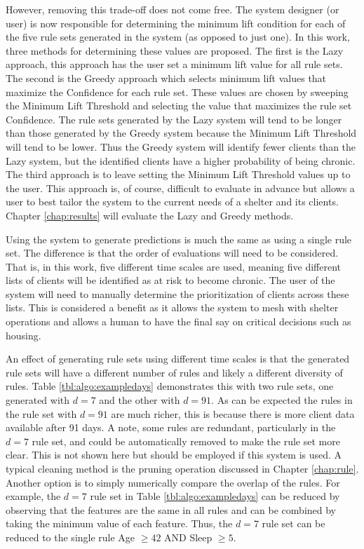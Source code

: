 However, removing this trade-off does not come free. The system designer (or user) is now responsible for determining the minimum lift condition for each of the five rule sets generated in the \Abb system (as opposed to just one). In this work, three methods for determining these values are proposed. The first is the Lazy approach, this approach has the user set a minimum lift value for all rule sets. The second is the Greedy approach which selects minimum lift values that maximize the Confidence for each rule set. These values are chosen by sweeping the Minimum Lift Threshold and selecting the value that maximizes the rule set Confidence.
The rule sets generated by the Lazy system will tend to be longer than those generated by the Greedy system because the Minimum Lift Threshold will tend to be lower.
Thus the Greedy system will identify fewer clients than the Lazy system, but the identified clients have a higher probability of being chronic. The third approach is to leave setting the Minimum Lift Threshold values up to the user. This approach is, of course, difficult to evaluate in advance but allows a user to best tailor the system to the current needs of a shelter and its clients. Chapter \ref{chap:results} will evaluate the Lazy and Greedy methods.


Using the \Abb system to generate predictions is much the same as using a single rule set. The difference is that the order of evaluations will need to be considered. That is, in this work, five different time scales are used, meaning five different lists of clients will be identified as at risk to become chronic. The user of the system will need to manually determine the prioritization of clients across these lists. This is considered a benefit as it allows the system to mesh with shelter operations and allows a human to have the final say on critical decisions such as housing. 

An effect of generating rule sets using different time scales is that the generated rule sets will have a different number of rules and likely a different diversity of rules. Table \ref{tbl:algo:exampledays} demonstrates this with two rule sets, one generated with $d=7$ and the other with $d=91$. As can be expected the rules in the rule set with $d=91$ are much richer, this is because there is more client data available after 91 days. A note, some rules are redundant, particularly in the $d=7$ rule set, and could be automatically removed to make the rule set more clear. This is not shown here but should be employed if this system is used. A typical cleaning method is the pruning operation discussed in Chapter \ref{chap:rule}. Another option is to simply numerically compare the overlap of the rules. For example, the $d=7$ rule set in Table \ref{tbl:algo:exampledays} can be reduced by observing that the features are the same in all rules and can be combined by taking the minimum value of each feature. Thus, the $d=7$ rule set can be reduced to the single rule Age $\geq 42$ AND Sleep $\geq 5$.


